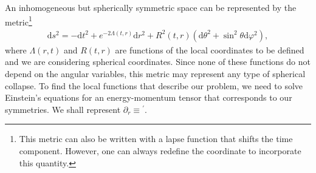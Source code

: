 \documentclass[a4paper,11pt]{article}
\begin{document}
An inhomogeneous but spherically symmetric space can be represented by the
metric\footnote{This metric can also be written with a lapse function that shifts the
	time component. However, one can always redefine the coordinate to incorporate this
	quantity.}
\begin{align}
	\mathrm{d} s^2=-\mathrm{d}t^2+e^{-2 \Lambda(t, r)} \mathrm{d} r^2+R^2(t, r)\left(\mathrm{d} \theta^2+\sin ^2 \theta \mathrm{d} \varphi^2\right)
	,\end{align}
where $\Lambda(r,t)$ and $R(t,r)$ are functions of the local coordinates to be defined
and we are considering spherical coordinates. Since none of these functions do not
depend on the angular variables, this metric may represent any type of spherical
collapse. To find the local functions that describe our problem, we need to solve
Einstein's equations for an energy-momentum tensor that corresponds to our symmetries.
We shall represent $\partial_r \equiv {}^\prime$.
\end{document}
